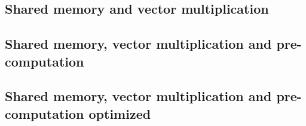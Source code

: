 \subsection{Shared memory and vector multiplication}
\label{ch:implementation:rkdp:shared-vecmult}

\subsection{Shared memory, vector multiplication and pre-computation}
\label{ch:implementation:rkdp:shared-vecmult-precomp}

\subsection{Shared memory, vector multiplication and pre-computation optimized}
\label{ch:implementation:rkdp:shared-vecmult-precomp-opti}
